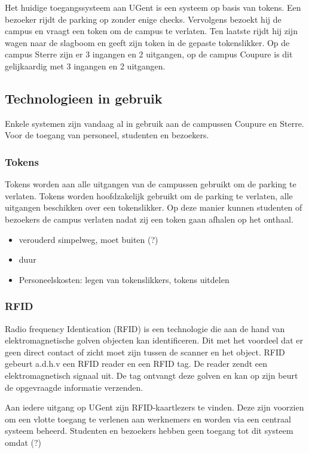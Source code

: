 Het huidige toegangssysteem aan UGent is een systeem op basis van tokens. Een bezoeker rijdt de parking op zonder enige checks. Vervolgens bezoekt hij de campus en vraagt een token om de campus te verlaten. Ten laatste rijdt hij zijn wagen naar de slagboom en geeft zijn token in de gepaste tokenslikker.
Op de campus Sterre zijn er 3 ingangen en 2 uitgangen, op de campus Coupure is dit gelijkaardig met 3 ingangen en 2 uitgangen.

\subsection{Technologieen in gebruik}
Enkele systemen zijn vandaag al in gebruik aan de campussen Coupure en Sterre. Voor de toegang van personeel, studenten en bezoekers.

\subsubsection{Tokens}

Tokens worden aan alle uitgangen van de campussen gebruikt om de parking te verlaten.
Tokens worden hoofdzakelijk gebruikt om de parking te verlaten, alle uitgangen beschikken over een tokenslikker. Op deze manier kunnen studenten of bezoekers de campus verlaten nadat zij een token gaan afhalen op het onthaal.
\begin{itemize}
	\item verouderd simpelweg, moet buiten (?)
	\item duur
	\item Personeelskosten: legen van tokenslikkers, tokens uitdelen
\end{itemize}

\subsubsection{RFID}

Radio frequency Identication (RFID) is een technologie die aan de hand van elektromagnetische golven objecten kan identificeren. Dit met het voordeel dat er geen direct contact of zicht moet zijn tussen de scanner en het object. RFID gebeurt a.d.h.v een RFID reader en een RFID tag. De reader zendt een elektromagnetisch signaal uit. De tag ontvangt deze golven en kan op zijn beurt de opgevraagde informatie verzenden. \autocite{li2009design}

Aan iedere uitgang op UGent zijn RFID-kaartlezers te vinden. Deze zijn voorzien om een vlotte toegang te verlenen aan werknemers en worden via een centraal systeem beheerd. Studenten en bezoekers hebben geen toegang tot dit systeem omdat (?)

